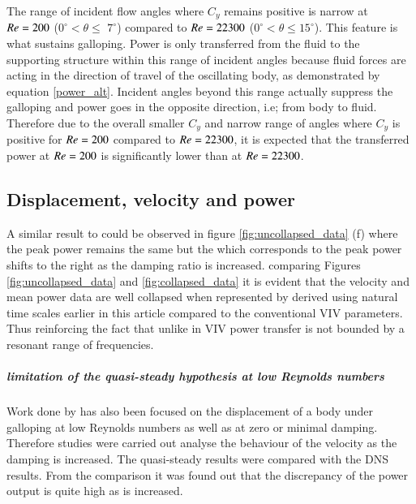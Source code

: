  The range of incident flow angles where $C_y$ remains positive is narrow at $Re=200$ ($0^\circ <\theta \leq$ $7^\circ$) compared to $Re=22300$ ($0^\circ <\theta \leq 15^\circ$). This feature is what sustains galloping. Power is only transferred from the fluid to the supporting structure within this range of incident angles because fluid forces are acting in the direction of travel of the oscillating body, as demonstrated by equation \ref{power_alt}. Incident angles beyond this range actually suppress the galloping and power goes in the opposite direction, i.e; from body to fluid. Therefore due to the overall smaller $C_y$ and narrow range of angles where $C_y$ is positive for $Re=200$ compared to $Re=22300$, it is expected that the transferred power at $Re=200$ is significantly lower than at $Re=22300$.
 

 
  
 \subsection{Displacement, velocity and power}
 
 A similar result to \cite{Barrero-Gil2010a} could be observed in figure \ref{fig:uncollapsed_data} (f)  where the peak power remains the same but the \ustar which corresponds to the peak power shifts to the right as the damping ratio is increased. comparing Figures \ref{fig:uncollapsed_data} and \ref{fig:collapsed_data} it is evident that the velocity and mean power data are well collapsed when represented by \massdamp derived using natural time scales earlier in this article compared to the conventional VIV parameters. Thus reinforcing the fact that unlike in VIV power transfer is not bounded by a resonant range of frequencies. 
 
 
\subparagraph{limitation of the quasi-steady hypothesis at low Reynolds numbers}

Work done by \cite{Joly2012} has also been focused on the displacement of a body under galloping at low Reynolds numbers as well as at zero or minimal damping. Therefore studies were carried out analyse the behaviour of the velocity as the damping is increased. The quasi-steady results were compared with the DNS results. From the comparison it was found out that the discrepancy of the power output is quite high as \massdamp is increased.  



 
 
 
